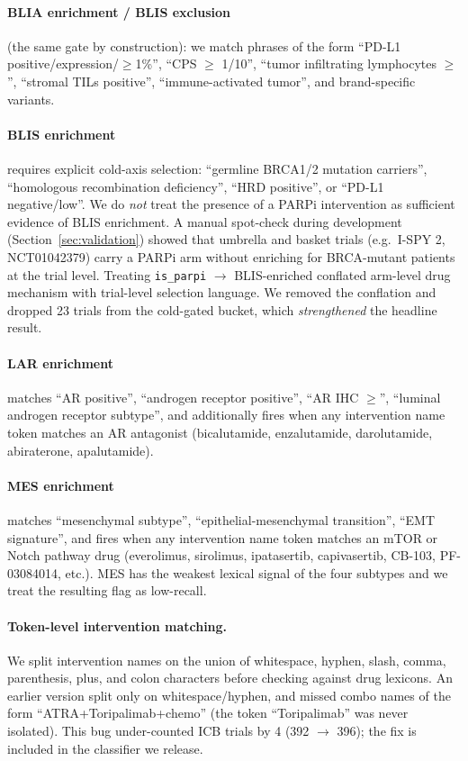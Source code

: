 \documentclass{article}
\begin{document}
\paragraph{BLIA enrichment / BLIS exclusion} (the same gate by
construction): we match phrases of the form ``PD-L1
positive/expression/$\geq$1\%'', ``CPS $\geq$ 1/10'', ``tumor
infiltrating lymphocytes $\geq$'', ``stromal TILs positive'',
``immune-activated tumor'', and brand-specific variants.

\paragraph{BLIS enrichment} requires explicit cold-axis selection:
``germline BRCA1/2 mutation carriers'', ``homologous recombination
deficiency'', ``HRD positive'', or ``PD-L1 negative/low''.  We do
\emph{not} treat the presence of a PARPi intervention as sufficient
evidence of BLIS enrichment.  A manual spot-check during development
(Section~\ref{sec:validation}) showed that umbrella and basket trials
(e.g.\ I-SPY 2, NCT01042379) carry a PARPi arm without enriching for
BRCA-mutant patients at the trial level.  Treating
\verb|is_parpi| $\rightarrow$ BLIS-enriched conflated arm-level drug
mechanism with trial-level selection language.  We removed the
conflation and dropped 23 trials from the cold-gated bucket, which
\emph{strengthened} the headline result.

\paragraph{LAR enrichment} matches ``AR positive'', ``androgen
receptor positive'', ``AR IHC $\geq$'', ``luminal androgen receptor
subtype'', and additionally fires when any intervention name token
matches an AR antagonist (bicalutamide, enzalutamide, darolutamide,
abiraterone, apalutamide).

\paragraph{MES enrichment} matches ``mesenchymal subtype'',
``epithelial-mesenchymal transition'', ``EMT signature'', and fires
when any intervention name token matches an mTOR or Notch pathway
drug (everolimus, sirolimus, ipatasertib, capivasertib, CB-103,
PF-03084014, etc.).  MES has the weakest lexical signal of the four
subtypes and we treat the resulting flag as low-recall.

\paragraph{Token-level intervention matching.}  We split intervention
names on the union of whitespace, hyphen, slash, comma, parenthesis,
plus, and colon characters before checking against drug lexicons.
An earlier version split only on whitespace/hyphen, and missed combo
names of the form ``ATRA+Toripalimab+chemo'' (the token
``Toripalimab'' was never isolated).  This bug under-counted ICB
trials by 4 (392 $\rightarrow$ 396); the fix is included in the
classifier we release.
\end{document}
